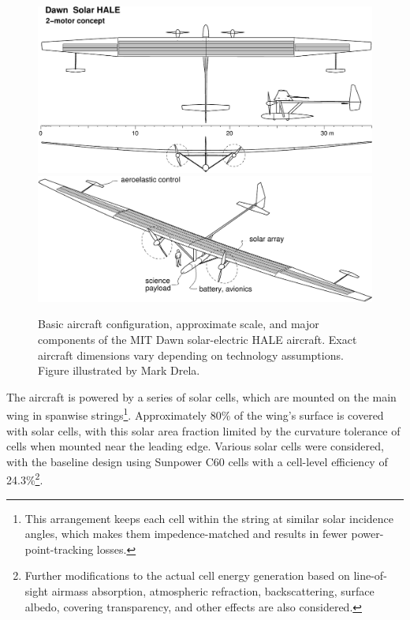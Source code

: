 \begin{figure}[h]
    \centering
    \includegraphics[width=\textwidth]{../figures/dawn1_3view.pdf}
    \includegraphics[width=\textwidth]{../figures/dawn1b.pdf}
    \caption{Basic aircraft configuration, approximate scale, and major components of the MIT Dawn solar-electric HALE aircraft. Exact aircraft dimensions vary depending on technology assumptions. Figure illustrated by Mark Drela.}
    \label{fig:dawn_overview}
\end{figure}


The aircraft is powered by a series of solar cells, which are mounted on the main wing in spanwise strings\footnote{This arrangement keeps each cell within the string at similar solar incidence angles, which makes them impedence-matched and results in fewer power-point-tracking losses.}. Approximately 80\% of the wing's surface is covered with solar cells, with this solar area fraction limited by the curvature tolerance of cells when mounted near the leading edge. Various solar cells were considered, with the baseline design using Sunpower C60 cells with a cell-level efficiency of 24.3\%\footnote{Further modifications to the actual cell energy generation based on line-of-sight airmass absorption, atmospheric refraction, backscattering, surface albedo, covering transparency, and other effects are also considered.}.

